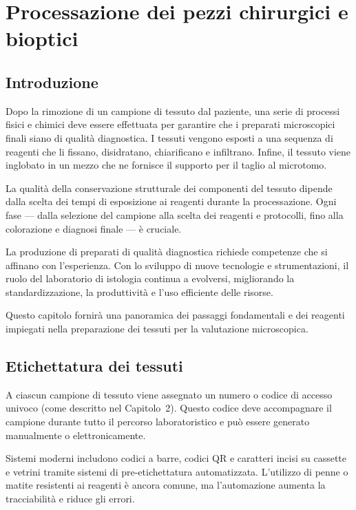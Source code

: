 \chapter{Processazione dei pezzi chirurgici e bioptici}

\section{Introduzione}
Dopo la rimozione di un campione di tessuto dal paziente, una serie di processi fisici e chimici deve essere effettuata per garantire che i preparati microscopici finali siano di qualità diagnostica.  
I tessuti vengono esposti a una sequenza di reagenti che li fissano, disidratano, chiarificano e infiltrano. Infine, il tessuto viene inglobato in un mezzo che ne fornisce il supporto per il taglio al microtomo.

La qualità della conservazione strutturale dei componenti del tessuto dipende dalla scelta dei tempi di esposizione ai reagenti durante la processazione. Ogni fase — dalla selezione del campione alla scelta dei reagenti e protocolli, fino alla colorazione e diagnosi finale — è cruciale.

La produzione di preparati di qualità diagnostica richiede competenze che si affinano con l’esperienza. Con lo sviluppo di nuove tecnologie e strumentazioni, il ruolo del laboratorio di istologia continua a evolversi, migliorando la standardizzazione, la produttività e l’uso efficiente delle risorse.  

Questo capitolo fornirà una panoramica dei passaggi fondamentali e dei reagenti impiegati nella preparazione dei tessuti per la valutazione microscopica.



\section{Etichettatura dei tessuti}
A ciascun campione di tessuto viene assegnato un numero o codice di accesso univoco (come descritto nel Capitolo~2).  
Questo codice deve accompagnare il campione durante tutto il percorso laboratoristico e può essere generato manualmente o elettronicamente.

Sistemi moderni includono codici a barre, codici QR e caratteri incisi su cassette e vetrini tramite sistemi di pre-etichettatura automatizzata. L’utilizzo di penne o matite resistenti ai reagenti è ancora comune, ma l’automazione aumenta la tracciabilità e riduce gli errori.

